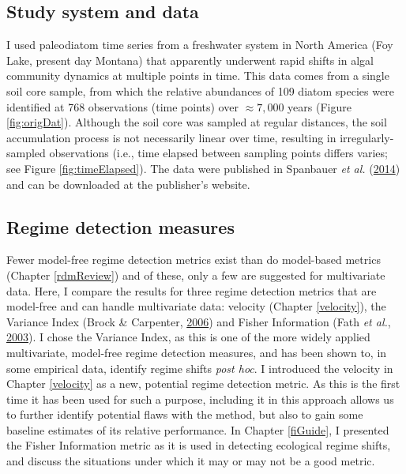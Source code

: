 \documentclass[12pt,twoside,openany]{reedthesis}
\begin{document}
\hypertarget{study-system-and-data}{%
\subsection{Study system and data}\label{study-system-and-data}}

I used paleodiatom time series from a freshwater system in North America (Foy Lake, present day Montana) that apparently underwent rapid shifts in algal community dynamics at multiple points in time. This data comes from a single soil core sample, from which the relative abundances of 109 diatom species were identified at 768 observations (time points) over \(\approx7,000\) years (Figure \ref{fig:origDat}). Although the soil core was sampled at regular distances, the soil accumulation process is not necessarily linear over time, resulting in irregularly-sampled observations (i.e., time elapsed between sampling points differs varies; see Figure \ref{fig:timeElapsed}). The data were published in Spanbauer \emph{et al.} (\protect\hyperlink{ref-spanbauer_prolonged_2014}{2014}) and can be downloaded at the publisher's website.

\hypertarget{regime-detection-measures}{%
\subsection{Regime detection measures}\label{regime-detection-measures}}

Fewer model-free regime detection metrics exist than do model-based metrics (Chapter \ref{rdmReview}) and of these, only a few are suggested for multivariate data. Here, I compare the results for three regime detection metrics that are model-free and can handle multivariate data: velocity (Chapter \ref{velocity}), the Variance Index (Brock \& Carpenter, \protect\hyperlink{ref-brock_variance_2006}{2006}) and Fisher Information (Fath \emph{et al.}, \protect\hyperlink{ref-fath_regime_2003}{2003}). I chose the Variance Index, as this is one of the more widely applied multivariate, model-free regime detection measures, and has been shown to, in some empirical data, identify regime shifts \emph{post hoc}. I introduced the velocity in Chapter \ref{velocity} as a new, potential regime detection metric. As this is the first time it has been used for such a purpose, including it in this approach allows us to further identify potential flaws with the method, but also to gain some baseline estimates of its relative performance. In Chapter \ref{fiGuide}, I presented the Fisher Information metric as it is used in detecting ecological regime shifts, and discuss the situations under which it may or may not be a good metric.
\end{document}
